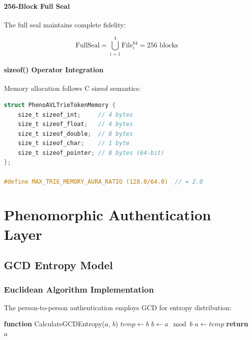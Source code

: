 \documentclass[12pt,a4paper]{report}
\theoremstyle{definition}
\begin{document}
\subsection{256-Block Full Seal}

The full seal maintains complete fidelity:

\begin{equation}
\text{FullSeal} = \bigcup_{i=1}^{4} \text{File}_i^{64} = 256 \text{ blocks}
\end{equation}

\subsection{sizeof() Operator Integration}

Memory allocation follows C sizeof semantics:

\begin{lstlisting}[language=C, caption=Dynamic Memory Allocation]
struct PhenoAVLTrieTokenMemory {
    size_t sizeof_int;     // 4 bytes
    size_t sizeof_float;   // 4 bytes
    size_t sizeof_double;  // 8 bytes
    size_t sizeof_char;    // 1 byte
    size_t sizeof_pointer; // 8 bytes (64-bit)
};

#define MAX_TRIE_MEMORY_AURA_RATIO (128.0/64.0)  // = 2.0
\end{lstlisting}


\part{Phenomorphic Authentication Layer}

\chapter{GCD Entropy Model}

\section{Euclidean Algorithm Implementation}

The person-to-person authentication employs GCD for entropy distribution:

\begin{algorithm}
\caption{GCD Entropy Calculation}
\begin{algorithmic}[1]
\STATE \textbf{function} CalculateGCDEntropy($a$, $b$)
    \STATE $temp \leftarrow b$
    \STATE $b \leftarrow a \mod b$
    \STATE $a \leftarrow temp$
\ENDWHILE
\STATE \textbf{return} $a$
\end{algorithmic}
\end{algorithm}
\end{document}
